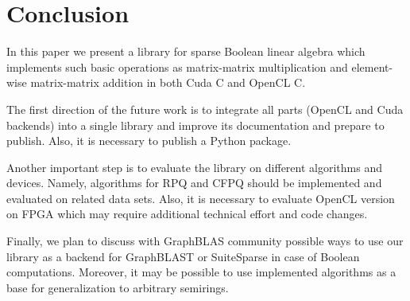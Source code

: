 \section{Conclusion}

In this paper we present a library for sparse Boolean linear algebra which implements such basic operations as matrix-matrix multiplication and element-wise matrix-matrix addition in both Cuda C and OpenCL C.


The first direction of the future work is to integrate all parts (OpenCL and Cuda backends) into a single library and improve its documentation and prepare to publish.
Also, it is necessary to publish a Python package.

Another important step is to evaluate the library on different algorithms and devices.
Namely, algorithms for RPQ and CFPQ should be implemented and evaluated on related data sets.
Also, it is necessary to evaluate OpenCL version on FPGA which may require additional technical effort and code changes.

Finally, we plan to discuss with GraphBLAS community possible ways to use our library as a backend for GraphBLAST or SuiteSparse in case of Boolean computations.
Moreover, it may be possible to use implemented algorithms as a base for generalization to arbitrary semirings.

